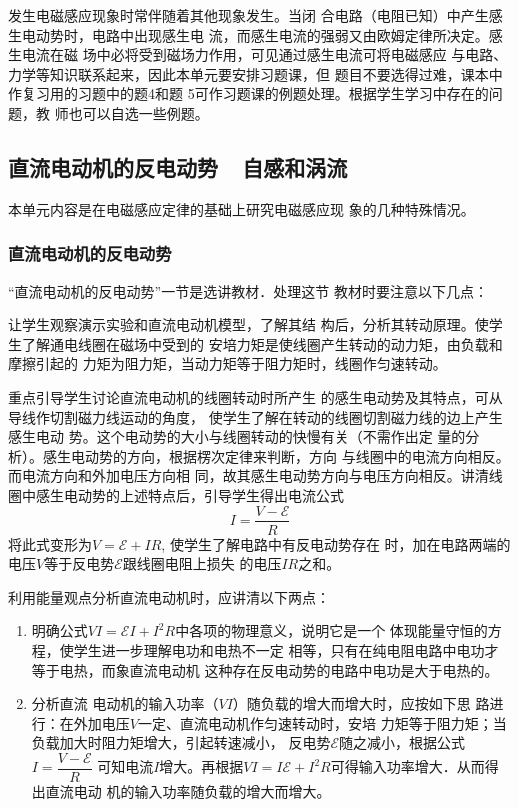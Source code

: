发生电磁感应现象时常伴随着其他现象发生。当闭
合电路（电阻已知）中产生感生电动势时，电路中出现感生电
流，而感生电流的强弱又由欧姆定律所决定。感生电流在磁
场中必将受到磁场力作用，可见通过感生电流可将电磁感应
与电路、力学等知识联系起来，因此本单元要安排习题课，但
题目不要选得过难，课本中作复习用的习题中的题4和题
5可作习题课的例题处理。根据学生学习中存在的问题，教
师也可以自选一些例题。

\subsection{直流电动机的反电动势~~自感和涡流}
本单元内容是在电磁感应定律的基础上研究电磁感应现
象的几种特殊情况。

\subsubsection{直流电动机的反电动势}
“直流电动机的反电动势”一节是选讲教材．处理这节
教材时要注意以下几点：

让学生观察演示实验和直流电动机模型，了解其结
构后，分析其转动原理。使学生了解通电线圈在磁场中受到的
安培力矩是使线圈产生转动的动力矩，由负载和摩擦引起的
力矩为阻力矩，当动力矩等于阻力矩时，线圈作匀速转动。

重点引导学生讨论直流电动机的线圈转动时所产生
的感生电动势及其特点，可从导线作切割磁力线运动的角度，
使学生了解在转动的线圈切割磁力线的边上产生感生电动
势。这个电动势的大小与线圈转动的快慢有关（不需作出定
量的分析）。感生电动势的方向，根据楞次定律来判断，方向
与线圈中的电流方向相反。而电流方向和外加电压方向相
同，故其感生电动势方向与电压方向相反。讲清线圈中感生电动势的上述特点后，引导学生得出电流公式
\[I=\frac{V-\mathcal{E}}{R}\]
将此式变形为$V=\mathcal{E}+IR$, 使学生了解电路中有反电动势存在
时，加在电路两端的电压$V$等于反电势$\mathcal{E}$跟线圈电阻上损失
的电压$IR$之和。

利用能量观点分析直流电动机时，应讲清以下两点：
\begin{enumerate}
    \item 明确公式$VI=\mathcal{E}I+I^2R$中各项的物理意义，说明它是一个
体现能量守恒的方程，使学生进一步理解电功和电热不一定
相等，只有在纯电阻电路中电功才等于电热，而象直流电动机
这种存在反电动势的电路中电功是大于电热的。
\item 分析直流
电动机的输入功率（$VI$）随负载的增大而增大时，应按如下思
路进行：在外加电压$V$一定、直流电动机作匀速转动时，安培
力矩等于阻力矩；当负载加大时阻力矩增大，引起转速减小，
反电势$\mathcal{E}$随之减小，根据公式$I=\dfrac{V-\mathcal{E}}{R}$
可知电流$I$增大。再根据$VI=I\mathcal{E}+I^2R$可得输入功率增大．从而得出直流电动
机的输入功率随负载的增大而增大。
\end{enumerate}

